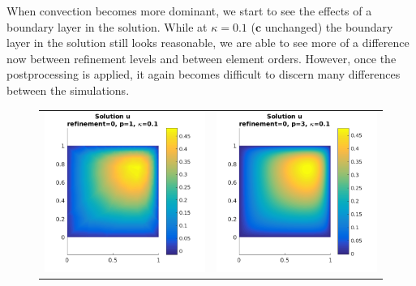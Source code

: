 \documentclass{article}
\begin{document}
When convection becomes more dominant, we start to see the effects of a boundary layer in the solution.
While at $\kappa = 0.1$ ($\mathbf{c}$ unchanged) the boundary layer in the solution still looks reasonable, we are able to see more of a difference now between refinement levels and between element orders.
However, once the postprocessing is applied, it again becomes difficult to discern many differences between the simulations.

\begin{figure}[!ht]
\centering
\begin{tabular}{c c}
\includegraphics[scale=0.7]{umu_112.png} & 
\includegraphics[scale=0.7]{umu_212.png} \\

\end{tabular}
\end{figure}
\end{document}
